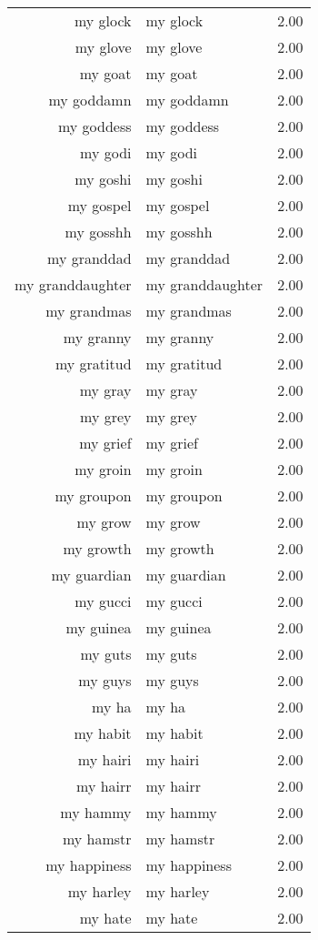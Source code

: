 \begin{table}[ht]
\begin{tabular}{rlr}
  my glock & my glock & 2.00 \\ 
  my glove & my glove & 2.00 \\ 
  my goat & my goat & 2.00 \\ 
  my goddamn & my goddamn & 2.00 \\ 
  my goddess & my goddess & 2.00 \\ 
  my godi & my godi & 2.00 \\ 
  my goshi & my goshi & 2.00 \\ 
  my gospel & my gospel & 2.00 \\ 
  my gosshh & my gosshh & 2.00 \\ 
  my granddad & my granddad & 2.00 \\ 
  my granddaughter & my granddaughter & 2.00 \\ 
  my grandmas & my grandmas & 2.00 \\ 
  my granny & my granny & 2.00 \\ 
  my gratitud & my gratitud & 2.00 \\ 
  my gray & my gray & 2.00 \\ 
  my grey & my grey & 2.00 \\ 
  my grief & my grief & 2.00 \\ 
  my groin & my groin & 2.00 \\ 
  my groupon & my groupon & 2.00 \\ 
  my grow & my grow & 2.00 \\ 
  my growth & my growth & 2.00 \\ 
  my guardian & my guardian & 2.00 \\ 
  my gucci & my gucci & 2.00 \\ 
  my guinea & my guinea & 2.00 \\ 
  my guts & my guts & 2.00 \\ 
  my guys & my guys & 2.00 \\ 
  my ha & my ha & 2.00 \\ 
  my habit & my habit & 2.00 \\ 
  my hairi & my hairi & 2.00 \\ 
  my hairr & my hairr & 2.00 \\ 
  my hammy & my hammy & 2.00 \\ 
  my hamstr & my hamstr & 2.00 \\ 
  my happiness & my happiness & 2.00 \\ 
  my harley & my harley & 2.00 \\ 
  my hate & my hate & 2.00 \\ 

\end{tabular}
\end{table}
